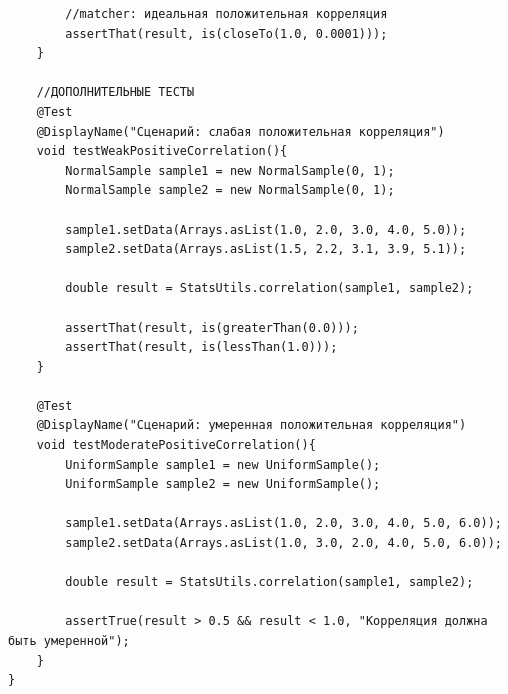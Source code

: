 \begin{verbatim}
        //matcher: идеальная положительная корреляция
        assertThat(result, is(closeTo(1.0, 0.0001)));
    }

    //ДОПОЛНИТЕЛЬНЫЕ ТЕСТЫ
    @Test
    @DisplayName("Сценарий: слабая положительная корреляция")
    void testWeakPositiveCorrelation(){
        NormalSample sample1 = new NormalSample(0, 1);
        NormalSample sample2 = new NormalSample(0, 1);

        sample1.setData(Arrays.asList(1.0, 2.0, 3.0, 4.0, 5.0));
        sample2.setData(Arrays.asList(1.5, 2.2, 3.1, 3.9, 5.1));

        double result = StatsUtils.correlation(sample1, sample2);

        assertThat(result, is(greaterThan(0.0)));
        assertThat(result, is(lessThan(1.0)));
    }

    @Test
    @DisplayName("Сценарий: умеренная положительная корреляция")
    void testModeratePositiveCorrelation(){
        UniformSample sample1 = new UniformSample();
        UniformSample sample2 = new UniformSample();

        sample1.setData(Arrays.asList(1.0, 2.0, 3.0, 4.0, 5.0, 6.0));
        sample2.setData(Arrays.asList(1.0, 3.0, 2.0, 4.0, 5.0, 6.0));

        double result = StatsUtils.correlation(sample1, sample2);

        assertTrue(result > 0.5 && result < 1.0, "Корреляция должна быть умеренной");
    }
}

\end{verbatim}
